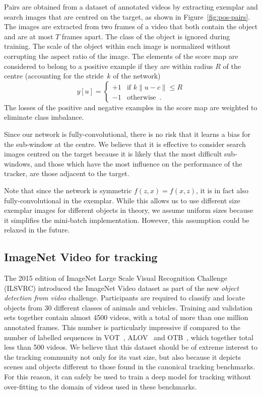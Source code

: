 Pairs are obtained from a dataset of annotated videos by extracting exemplar and search images that are centred on the target, as shown in Figure~\ref{fig:pos-pairs}.
The images are extracted from two frames of a video that both contain the object and are at most $T$ frames apart.
The class of the object is ignored during training.
The scale of the object within each image is normalized without corrupting the aspect ratio of the image.
The elements of the score map are considered to belong to a positive example if they are within radius $R$ of the centre (accounting for the stride~$k$ of the network)
\begin{equation}
y[u] = \begin{cases} +1 & \text{if } k \|u - c\| \le R \\ -1 & \text{otherwise} \enspace . \end{cases}
\end{equation}
The losses of the positive and negative examples in the score map are weighted to eliminate class imbalance.

Since our network is fully-convolutional, there is no risk that it learns a bias for the sub-window at the centre.
We believe that it is effective to consider search images centred on the target because it is likely that the most difficult sub-windows, and those which have the most influence on the performance of the tracker, are those adjacent to the target.




Note that since the network is symmetric $f(z, x) = f(x, z)$, it is in fact also fully-convolutional in the exemplar.
While this allows us to use different size exemplar images for different objects in theory, we assume uniform sizes because it simplifies the mini-batch implementation.
However, this assumption could be relaxed in the future.

\subsection{ImageNet Video for tracking}

The 2015 edition of ImageNet Large Scale Visual Recognition Challenge~\cite{ILSVRC15} (ILSVRC) introduced the ImageNet Video dataset as part of the new \emph{object detection from video} challenge.
Participants are required to classify and locate objects from 30 different classes of animals and vehicles.
Training and validation sets together contain almost 4500 videos, with a total of more than one million annotated frames.
This number is particularly impressive if compared to the number of labelled sequences in VOT~\cite{kristan2015visual}, ALOV~\cite{smeulders2014visual} and OTB~\cite{WuLimYang13}, which together total less than 500 videos.
We believe that this dataset should be of extreme interest to the tracking community not only for its vast size, but also because it depicts scenes and objects different to those found in the canonical tracking benchmarks.
For this reason, it can safely be used to train a deep model for tracking without over-fitting to the domain of videos used in these benchmarks.



